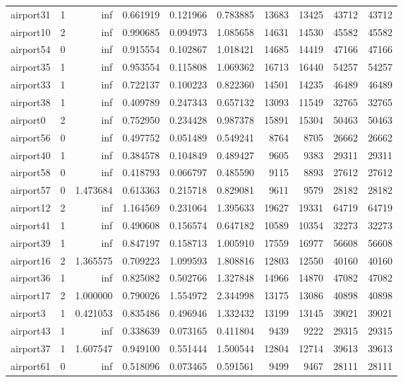 \begin{longtable}{|l|r|r|r|r|r|r|r|r|r|}
airport31 & 1 & inf & 0.661919 & 0.121966 & 0.783885 & 13683 & 13425 & 43712 & 43712 \\
airport10 & 2 & inf & 0.990685 & 0.094973 & 1.085658 & 14631 & 14530 & 45582 & 45582 \\
airport54 & 0 & inf & 0.915554 & 0.102867 & 1.018421 & 14685 & 14419 & 47166 & 47166 \\
airport35 & 1 & inf & 0.953554 & 0.115808 & 1.069362 & 16713 & 16440 & 54257 & 54257 \\
airport33 & 1 & inf & 0.722137 & 0.100223 & 0.822360 & 14501 & 14235 & 46489 & 46489 \\
airport38 & 1 & inf & 0.409789 & 0.247343 & 0.657132 & 13093 & 11549 & 32765 & 32765 \\
airport0 & 2 & inf & 0.752950 & 0.234428 & 0.987378 & 15891 & 15304 & 50463 & 50463 \\
airport56 & 0 & inf & 0.497752 & 0.051489 & 0.549241 & 8764 & 8705 & 26662 & 26662 \\
airport40 & 1 & inf & 0.384578 & 0.104849 & 0.489427 & 9605 & 9383 & 29311 & 29311 \\
airport58 & 0 & inf & 0.418793 & 0.066797 & 0.485590 & 9115 & 8893 & 27612 & 27612 \\
airport57 & 0 & 1.473684 & 0.613363 & 0.215718 & 0.829081 & 9611 & 9579 & 28182 & 28182 \\
airport12 & 2 & inf & 1.164569 & 0.231064 & 1.395633 & 19627 & 19331 & 64719 & 64719 \\
airport41 & 1 & inf & 0.490608 & 0.156574 & 0.647182 & 10589 & 10354 & 32273 & 32273 \\
airport39 & 1 & inf & 0.847197 & 0.158713 & 1.005910 & 17559 & 16977 & 56608 & 56608 \\
airport16 & 2 & 1.365575 & 0.709223 & 1.099593 & 1.808816 & 12803 & 12550 & 40160 & 40160 \\
airport36 & 1 & inf & 0.825082 & 0.502766 & 1.327848 & 14966 & 14870 & 47082 & 47082 \\
airport17 & 2 & 1.000000 & 0.790026 & 1.554972 & 2.344998 & 13175 & 13086 & 40898 & 40898 \\
airport3 & 1 & 0.421053 & 0.835486 & 0.496946 & 1.332432 & 13199 & 13145 & 39021 & 39021 \\
airport43 & 1 & inf & 0.338639 & 0.073165 & 0.411804 & 9439 & 9222 & 29315 & 29315 \\
airport37 & 1 & 1.607547 & 0.949100 & 0.551444 & 1.500544 & 12804 & 12714 & 39613 & 39613 \\
airport61 & 0 & inf & 0.518096 & 0.073465 & 0.591561 & 9499 & 9467 & 28111 & 28111 \\

\end{longtable}
